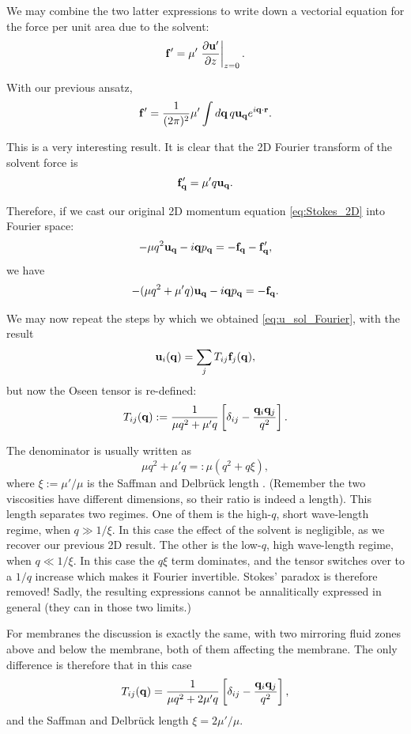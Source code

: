 We may combine the two latter expressions to write down a vectorial
equation for the force per unit area due to the solvent:
\[
  \mathbf{f}' = \mu' \left. \frac{\partial \mathbf{u}'}{\partial z} \right|_{z=0} .
\]

With our previous ansatz,
\[
  \mathbf{f}' = \frac 1{(2\pi)^2} \mu' \int d\mathbf{q} \, q \mathbf{u}_{\mathbf{q}} e^{
    i\mathbf{q}\cdot\mathbf{r}} .
\]

This is a very interesting result. It is clear that the 2D Fourier
transform of the solvent force is
\[
  \mathbf{f}'_{\mathbf{q}} =  \mu' q \mathbf{u}_{\mathbf{q}} .
\]

Therefore, if we cast our original 2D momentum equation
\ref{eq:Stokes_2D} into Fourier space:
\[
-  \mu q^2 \mathbf{u}_{\mathbf{q}} - i \mathbf{q} p_{\mathbf{q}} = -\mathbf{f}_{\mathbf{q}} -\mathbf{f}'_{\mathbf{q}} ,
\]
we have
\[
-  ( \mu q^2 +  \mu' q ) \mathbf{u}_{\mathbf{q}} - i \mathbf{q} p_{\mathbf{q}} = -\mathbf{f}_{\mathbf{q}} .
\]

We may now repeat the steps by which we obtained
\ref{eq:u_sol_Fourier}, with the result
\begin{equation*}
\mathbf{u}_i(\mathbf{q}) =  \sum_j T_{ij} \mathbf{f}_j(\mathbf{q}),
\end{equation*}
%
but now the Oseen tensor is re-defined:
\[
T_{ij}(\mathbf{q}) := \frac 1{\mu q^2 +  \mu' q  } \left[
  \delta_{ij} - \frac{ \mathbf{q}_i  \mathbf{q}_j}{q^2} 
\right].
\]

The denominator is usually written as
\[
  \mu q^2 +  \mu' q =:
  \mu (q^2 +  q \xi ) ,
\]
where $\xi:= \mu'/\mu$ is the Saffman and Delbr{\"u}ck length
. (Remember the two
viscosities have different dimensions, so their ratio is indeed a
length). This length separates two regimes.  One of them is the
high-$q$, short wave-length regime, when $q \gg 1/\xi$. In this case
the effect of the solvent is negligible, as we recover our previous 2D
result. The other is the low-$q$, high wave-length regime, when
$q \ll 1/\xi$. In this case the $q\xi$ term dominates, and the tensor
switches over to a $1/q$ increase which makes it Fourier
invertible. Stokes' paradox is therefore removed! Sadly, the resulting
expressions cannot be annalitically expressed in general (they can in
those two limits.)

For membranes the discussion is exactly the same, with two mirroring
fluid zones above and below the membrane, both of them affecting the
membrane. The only difference is therefore that in this case
\[
T_{ij}(\mathbf{q}) = \frac 1{\mu q^2 +  2 \mu' q  } \left[
  \delta_{ij} - \frac{ \mathbf{q}_i  \mathbf{q}_j}{q^2} 
\right],
\]
and the Saffman and Delbr{\"u}ck length $\xi = 2 \mu'/\mu$.




